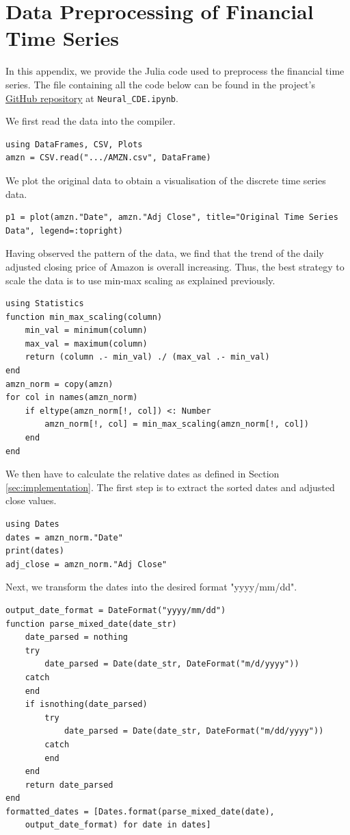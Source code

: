 \documentclass[a4paper,11pt,titlepage]{article}
\theoremstyle{definition}
\theoremstyle{plain}
\theoremstyle{remark}
\begin{document}
\pagebreak
\section{Data Preprocessing of Financial Time Series}
\label{sec:datatime}

In this appendix, we provide the Julia code used to preprocess the financial time series. The file containing all the code below can be found in the project's \href{https://github.com/jaamestaay/M2R-Group-29}{GitHub repository} at \verb|Neural_CDE.ipynb|.

We first read the data into the compiler.
\begin{verbatim}
using DataFrames, CSV, Plots
amzn = CSV.read(".../AMZN.csv", DataFrame)
\end{verbatim}

We plot the original data to obtain a visualisation of the discrete time series data.
\begin{verbatim}
p1 = plot(amzn."Date", amzn."Adj Close", title="Original Time Series
Data", legend=:topright)
\end{verbatim}

Having observed the pattern of the data, we find that the trend of the daily adjusted closing price of Amazon is overall increasing. Thus, the best strategy to scale the data is to use min-max scaling as explained previously.
\begin{verbatim}
using Statistics
function min_max_scaling(column)
    min_val = minimum(column)
    max_val = maximum(column)
    return (column .- min_val) ./ (max_val .- min_val)
end
amzn_norm = copy(amzn)
for col in names(amzn_norm)
    if eltype(amzn_norm[!, col]) <: Number
        amzn_norm[!, col] = min_max_scaling(amzn_norm[!, col])
    end
end
\end{verbatim}

We then have to calculate the relative dates as defined in Section \ref{sec:implementation}. The first step is to extract the sorted dates and adjusted close values. 
\begin{verbatim}
using Dates
dates = amzn_norm."Date"
print(dates)
adj_close = amzn_norm."Adj Close"
\end{verbatim}

Next, we transform the dates into the desired format "yyyy/mm/dd".
\begin{verbatim}
output_date_format = DateFormat("yyyy/mm/dd")
function parse_mixed_date(date_str)
    date_parsed = nothing
    try
        date_parsed = Date(date_str, DateFormat("m/d/yyyy"))
    catch
    end
    if isnothing(date_parsed)
        try
            date_parsed = Date(date_str, DateFormat("m/dd/yyyy"))
        catch
        end
    end
    return date_parsed
end
formatted_dates = [Dates.format(parse_mixed_date(date), 
    output_date_format) for date in dates]
\end{verbatim}
\end{document}
